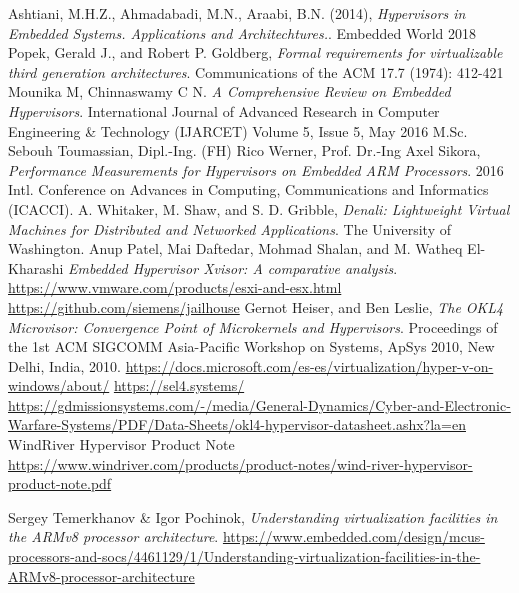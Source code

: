 \documentclass[spanish,12pt,a4paper,oneside]{book}
\begin{document}
\begin{thebibliography}{00}
	  Ashtiani, M.H.Z., Ahmadabadi, M.N., Araabi, B.N. (2014), \emph{Hypervisors in Embedded Systems. Applications and Architechtures.}. Embedded World 2018
	 Popek, Gerald J., and Robert P. Goldberg, \emph{Formal requirements for virtualizable third generation architectures}. Communications of the ACM 17.7 (1974): 412-421
	 Mounika M, Chinnaswamy C N. \emph{A Comprehensive Review on Embedded Hypervisors}. International Journal of Advanced Research in Computer Engineering \& Technology (IJARCET) Volume 5, Issue 5, May 2016
	 M.Sc. Sebouh Toumassian, Dipl.-Ing. (FH) Rico Werner, Prof. Dr.-Ing Axel Sikora, \emph{Performance Measurements for Hypervisors on Embedded ARM Processors}. 2016 Intl. Conference on Advances in Computing, Communications and Informatics (ICACCI).
	 A. Whitaker, M. Shaw, and S. D. Gribble, \emph{Denali: Lightweight Virtual Machines for Distributed and Networked Applications}. The University of Washington.
   Anup Patel, Mai Daftedar, Mohmad Shalan, and M. Watheq El-Kharashi \emph{Embedded Hypervisor Xvisor: A comparative analysis}.
   \url{https://www.vmware.com/products/esxi-and-esx.html}
   \url{https://github.com/siemens/jailhouse}
   Gernot Heiser, and Ben Leslie, \emph{The OKL4 Microvisor: Convergence Point of Microkernels and Hypervisors}. Proceedings of the 1st ACM SIGCOMM Asia-Pacific Workshop on Systems, ApSys 2010, New Delhi, India, 2010.
   \url{https://docs.microsoft.com/es-es/virtualization/hyper-v-on-windows/about/}
   \url{https://sel4.systems/}
   \url{https://gdmissionsystems.com/-/media/General-Dynamics/Cyber-and-Electronic-Warfare-Systems/PDF/Data-Sheets/okl4-hypervisor-datasheet.ashx?la=en}
   WindRiver Hypervisor Product Note \url{https://www.windriver.com/products/product-notes/wind-river-hypervisor-product-note.pdf}




   Sergey Temerkhanov \& Igor Pochinok, \emph{Understanding virtualization facilities in the ARMv8 processor architecture}. \url{https://www.embedded.com/design/mcus-processors-and-socs/4461129/1/Understanding-virtualization-facilities-in-the-ARMv8-processor-architecture}


\end{thebibliography}
\end{document}
